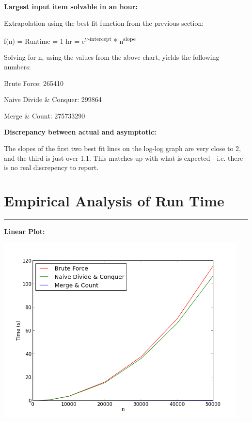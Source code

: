 \documentclass[letterpaper,10pt,titlepage,fleqn]{article}
\begin{document}
\begin{centering}
\textbf{Largest input item solvable in an hour:}
\end{centering}

Extrapolation using the best fit function from the previous section: 

f(n) = Runtime = 1 hr = e\textsuperscript{y-intercept} * n\textsuperscript{slope}

Solving for n, using the values from the above chart, yields the following numbers: 

Brute Force: 265410

Naive Divide \& Conquer: 299864

Merge \& Count: 275733290

\begin{centering}
\textbf{Discrepancy between actual and asymptotic:}
\end{centering}

The slopes of the first two best fit lines on the log-log graph are very close to 2, and the third is just over 1.1. This matches up with what is expected - i.e. there is no real discrepency to report.

\newpage

\section*{Empirical Analysis of Run Time}
\hrule

\textbf{Linear Plot:}
\vskip 0.04in
\begin{center}

\includegraphics[width=5in]{input_time.png}

\end{center}
\end{document}
